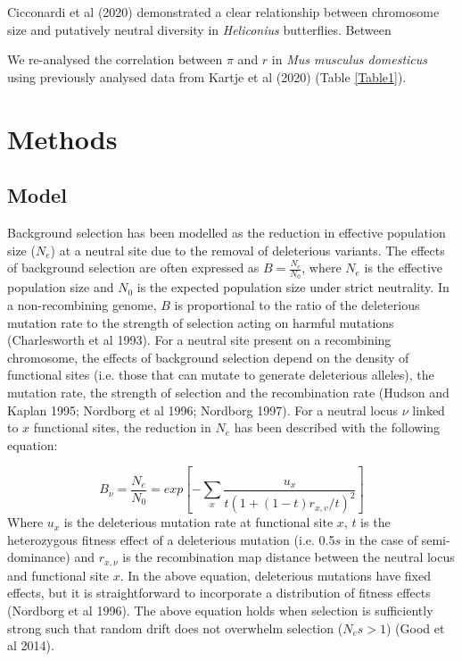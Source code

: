\documentclass[11pt,twoside,lineno]{GSA_format}
\begin{document}



Cicconardi et al (2020) demonstrated a clear relationship between chromosome size and putatively neutral diversity in \textit{Heliconius} butterflies. Between 


We re-analysed the correlation between $\pi$ and $r$ in \textit{Mus musculus domesticus} using previously analysed data from Kartje et al (2020) (Table \ref{Table1}). 



\section{Methods}
\subsection{Model}
Background selection has been modelled as the reduction in effective population size ($N_e$) at a neutral site due to the removal of deleterious variants. The effects of background selection are often expressed as $B = \frac{N_e}{N_0}$, where $N_e$ is the effective population size and $N_0$ is the expected population size under strict neutrality. In a non-recombining genome, $B$ is proportional to the ratio of the deleterious mutation rate to the strength of selection acting on harmful mutations (Charlesworth et al 1993). For a neutral site present on a recombining chromosome, the effects of background selection depend on the density of functional sites (i.e. those that can mutate to generate deleterious alleles), the mutation rate, the strength of selection and the recombination rate (Hudson and Kaplan 1995; Nordborg et al 1996; Nordborg 1997). For a neutral locus $\nu$ linked to $x$ functional sites, the reduction in $N_e$ has been described with the following equation:

\begin{equation}
B_{\nu} = \frac{N_e}{N_0} = exp[ -\sum\limits_x \frac{u_x}{t(1+(1-t)r_{x,v}/t)^2} ]
\label{nordborg}
\end{equation}\noindent
Where $u_x$ is the deleterious mutation rate at functional site $x$, $t$ is the heterozygous fitness effect of a deleterious mutation (i.e. 0.5$s$ in the case of semi-dominance) and $r_{x,\nu}$ is the recombination map distance between the neutral locus and functional site $x$. In the above equation, deleterious mutations have fixed effects, but it is straightforward to incorporate a distribution of fitness effects (Nordborg et al 1996). The above equation holds when selection is sufficiently strong  such that random drift does not overwhelm selection ($N_es > 1$) (Good et al 2014). \\
\end{document}
